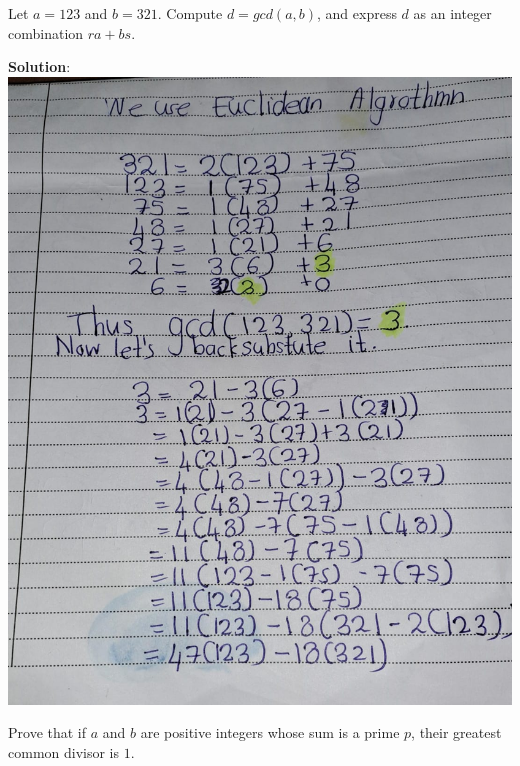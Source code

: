 \documentclass[
]{book}
\begin{document}
\leavevmode{}%
Let \(a = 123\) and \(b = 321\). Compute \(d = gcd(a, b)\), and express
\(d\) as an integer combination \(ra + bs\).

\textbf{Solution}: \includegraphics{figures/ch_2/fig20.jpg}

\leavevmode{}%
Prove that if \(a\) and \(b\) are positive integers whose sum is a prime
\(p\), their greatest common divisor is \(1\).
\end{document}
